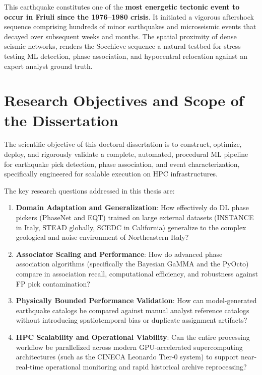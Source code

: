 This earthquake constitutes one of the \textbf{most energetic tectonic event to
occur in Friuli since the 1976--1980 crisis}. It initiated a vigorous
aftershock sequence comprising hundreds of minor earthquakes and microseismic
events that decayed over subsequent weeks and months. The spatial proximity of
dense seismic networks, renders the Socchieve sequence a natural testbed for
stress-testing \ac{ML} detection, phase association, and hypocentral relocation
against an expert analyst ground truth.

\section{Research Objectives and Scope of the Dissertation}
\label{sec:objectives}

The scientific objective of this doctoral dissertation is to construct,
optimize, deploy, and rigorously validate a complete, automated, procedural
\ac{ML} pipeline for earthquake pick detection, phase association, and event
characterization, specifically engineered for scalable execution on \ac{HPC}
infrastructures.

The key research questions addressed in this thesis are:
\begin{enumerate}
  \item \textbf{Domain Adaptation and Generalization}: How effectively do
    \ac{DL} phase pickers (\ac{PhaseNet} and \ac{EQT}) trained on large
    external datasets (\ac{INSTANCE} in Italy, \ac{STEAD} globally, \ac{SCEDC}
    in California) generalize to the complex geological and noise environment
    of Northeastern Italy?
  \item \textbf{Associator Scaling and Performance}: How do advanced phase
    association algorithms (specifically the Bayesian \acf{GaMMA} and the
    \acf{PyOcto}) compare in association recall, computational efficiency, and
    robustness against \ac{FP} pick contamination?
  \item \textbf{Physically Bounded Performance Validation}: How can
    model-generated earthquake catalogs be compared against manual analyst
    reference catalogs without introducing spatiotemporal bias or duplicate
    assignment artifacts?
  \item \textbf{HPC Scalability and Operational Viability}: Can the entire
    processing workflow  be parallelized
    across modern \ac{GPU}-accelerated supercomputing architectures (such as
    the \ac{CINECA} Leonardo Tier-0 system) to support near-real-time
    operational monitoring and rapid historical archive reprocessing?
\end{enumerate}

